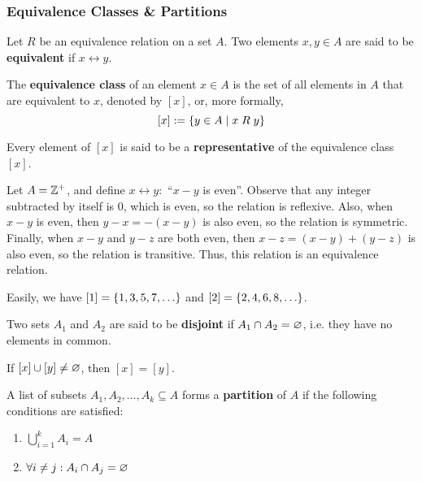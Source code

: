 \subsubsection{Equivalence Classes \& Partitions}

\begin{lemma}
    Let $R$ be an equivalence relation on a set $A$. Two elements $x, y \in A$ are said to be
    \textbf{equivalent} if $x\rel y$.
\end{lemma}

\begin{definition}
    The \textbf{equivalence class} of an element $x \in A$ is the set of all elements in $A$
    that are equivalent to $x$, denoted by $[x]$, or, more formally,
    \[
        [x] := \{y \in A \mid x\mathrel R y\}
    \]

    Every element of $[x]$ is said to be a \textbf{representative} of the equivalence class $[x]$.
\end{definition}

\begin{example}
    Let $A = \mathbb{Z}^+$, and define $x\rel y:$ ``$x-y$ is even''.
    Observe that any integer subtracted by itself is $0$, which is even,
    so the relation is reflexive.
    Also, when $x-y$ is even, then $y-x = -(x-y)$ is also even, so the relation is symmetric.
    Finally, when $x-y$ and $y-z$ are both even, then $x-z = (x-y) + (y-z)$ is also even,
    so the relation is transitive.
    Thus, this relation is an equivalence relation.

    Easily, we have $[1] = \{1, 3, 5, 7, \ldots\}$ and $[2] = \{2, 4, 6, 8, \ldots\}$.
\end{example}

\begin{lemma}
    Two sets $A_1$ and $A_2$ are said to be \textbf{disjoint} if $A_1 \cap A_2 = \varnothing$,
    i.e. they have no elements in common.
\end{lemma}

\begin{theorem}
    If $[x]\cup[y]\neq\varnothing$, then $[x] = [y]$.
\end{theorem}

\begin{definition}
    A list of subsets $A_1, A_2, \ldots, A_k \subseteq A$ forms a \textbf{partition} of $A$
    if the following conditions are satisfied:
    \begin{enumerate}
        \item $\displaystyle\bigcup_{i=1}^k A_i = A$
        \item $\forall i \neq j : A_i \cap A_j = \varnothing $
    \end{enumerate}
\end{definition}

